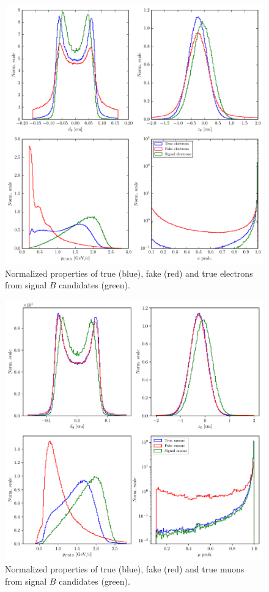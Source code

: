 \begin{figure}[H]
\centering
\includegraphics[width=\linewidth]{fig/FSP_e_vars}
\captionsetup{width=.8\linewidth}
\caption{Normalized properties of true (blue), fake (red) and true electrons from signal $B$ candidates (green).}
\label{fig:evars}
\end{figure}

\begin{figure}[H]
\centering
\includegraphics[width=\linewidth]{fig/FSP_mu_vars}
\captionsetup{width=.8\linewidth}
\caption{Normalized properties of true (blue), fake (red) and true muons from signal $B$ candidates (green).}
\label{fig:muvars}
\end{figure}

